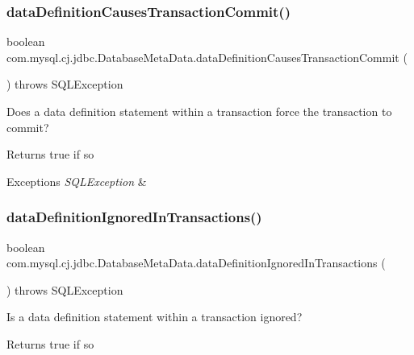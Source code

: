 \subsubsection{\texorpdfstring{data\+Definition\+Causes\+Transaction\+Commit()}{dataDefinitionCausesTransactionCommit()}}
{\footnotesize\ttfamily boolean com.\+mysql.\+cj.\+jdbc.\+Database\+Meta\+Data.\+data\+Definition\+Causes\+Transaction\+Commit (\begin{DoxyParamCaption}{ }\end{DoxyParamCaption}) throws S\+Q\+L\+Exception}

Does a data definition statement within a transaction force the transaction to commit?

\begin{DoxyReturn}{Returns}
true if so 
\end{DoxyReturn}

\begin{DoxyExceptions}{Exceptions}
{\em S\+Q\+L\+Exception} & \\
\hline
\end{DoxyExceptions}
\mbox{\label{classcom_1_1mysql_1_1cj_1_1jdbc_1_1_database_meta_data_a845084ae2565f8acc9b972b9a28f101d}} 
\subsubsection{\texorpdfstring{data\+Definition\+Ignored\+In\+Transactions()}{dataDefinitionIgnoredInTransactions()}}
{\footnotesize\ttfamily boolean com.\+mysql.\+cj.\+jdbc.\+Database\+Meta\+Data.\+data\+Definition\+Ignored\+In\+Transactions (\begin{DoxyParamCaption}{ }\end{DoxyParamCaption}) throws S\+Q\+L\+Exception}

Is a data definition statement within a transaction ignored?

\begin{DoxyReturn}{Returns}
true if so 
\end{DoxyReturn}

